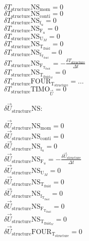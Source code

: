 \documentclass[10pt]{article} %
\begin{document}
\begin{center}
	$\delta T_{\text{structure}} \text{NS}_{\text{mom}} = 0$\\
	$\delta T_{\text{structure}} \text{NS}_{\text{conti}} = 0$\\
	$\delta T_{\text{structure}} \text{NS}_{\text{f}_u} = 0$\\
	$\delta T_{\text{structure}} \text{NS}_{\text{F}_u} = 0$\\
	$\delta T_{\text{structure}} \text{NS}_{\text{U}_M} = 0$\\
	$\delta T_{\text{structure}} \text{NS}_{\text{T}_{\text{fluid}}} = 0 $\\
	$\delta T_{\text{structure}} \text{NS}_{\text{f}_{\text{T}_{\text{fluid}}}} = 0$\\
	$\delta T_{\text{structure}} \text{NS}_{\text{F}_{\text{T}_{\text{fluid}}}} = -\frac{\delta T_{\text{structure}}}{\Delta t}$\\
	$\delta T_{\text{structure}} \text{NS}_{\text{T}_{\text{fluid}_M}} = 0$\\
	$\delta T_{\text{structure}} \text{FOUR}_{\text{T}_{\text{structure}}} = ...$\\
	$\delta T_{\text{structure}} \text{TIMO}_{\vec{U}} = 0$\\
\begin{flushleft}
	$\delta \vec{U}_{\text{structure}} \text{NS}:$
\end{flushleft}
	$\delta \vec{U}_{\text{structure}} \text{NS}_{\text{mom}} =  0$\\
	$\delta \vec{U}_{\text{structure}} \text{NS}_{\text{conti}} = 0$\\
	$\delta \vec{U}_{\text{structure}} \text{NS}_{\text{f}_u} = 0$\\
	$\delta \vec{U}_{\text{structure}} \text{NS}_{\text{F}_u} = -\frac{\delta \vec{U}_{\text{structure}}}{\Delta t}$\\
	$\delta \vec{U}_{\text{structure}} \text{NS}_{\text{U}_M} = 0$\\
	$\delta \vec{U}_{\text{structure}} \text{NS}_{\text{T}_{\text{fluid}}} = 0$\\
	$\delta \vec{U}_{\text{structure}} \text{NS}_{\text{f}_{\text{T}_{\text{fluid}}}} = 0$\\
	$\delta \vec{U}_{\text{structure}} \text{NS}_{\text{F}_{\text{T}_{\text{fluid}}}} = 0$\\
	$\delta \vec{U}_{\text{structure}} \text{NS}_{\text{T}_{\text{fluid}_M}} = 0$\\
	$\delta \vec{U}_{\text{structure}} \text{FOUR}_{\text{T}_{\text{structure}}} = 0$\\

\end{center}
\end{document}
